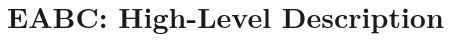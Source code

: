\documentclass[runningheads]{llncs}
\begin{document}














\section{EABC: High-Level Description}
\label{s:EABChighlevel}
\end{document}
